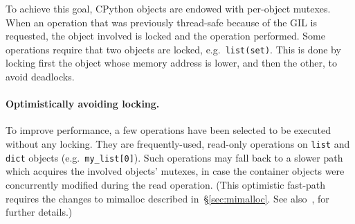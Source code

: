 To achieve this goal, CPython objects are endowed with per-object mutexes.
When an operation that was previously thread-safe because of the GIL is requested, the object involved is locked and the operation performed.
Some operations require that two objects are locked, e.g.\ \texttt{{list(set)}}.
This is done by locking first the object whose memory address is lower, and then the other, to avoid deadlocks.

\paragraph{Optimistically avoiding locking.}
To improve performance, a few operations have been selected to be executed without any locking.
They are frequently-used, read-only operations on \texttt{list} and \texttt{dict} objects (e.g.\ \texttt{{my\_list[0]}}).
Such operations may fall back to a slower path which acquires the involved objects' mutexes, in case the container objects were concurrently modified during the read operation.
(This optimistic fast-path requires the changes to mimalloc described in~\S\ref{sec:mimalloc}.
See also~\cite[\S Optimistically Avoiding Locking]{pep703}, for further details.)
